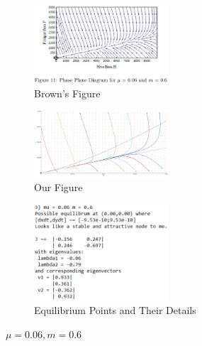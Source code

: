 \documentclass[a4paper,10pt]{article}
\begin{document}
\begin{figure}[H]
	\centering
	\begin{subfigure}[b]{0.4\textwidth}
		\centering
		\includegraphics[width=5cm]{Figure_11_3.jpg}%
		\caption{Brown's Figure\cite{Brown}}
	\end{subfigure}
	\hfill
	\begin{subfigure}[b]{0.4\textwidth}
		\centering
		\includegraphics[width=5cm]{FIgure_3_M483_Phase.png}
		\caption{Our Figure}
	\end{subfigure}
	\begin{subfigure}[b]{0.4\textwidth}
		\centering
		\includegraphics[width = 5cm]{Project_App_Info_3.png}
		\caption{Equilibrium Points and Their Details}
	\end{subfigure}
	\caption{$\mu = 0.06, m = 0.6$}
\end{figure}
\end{document}
